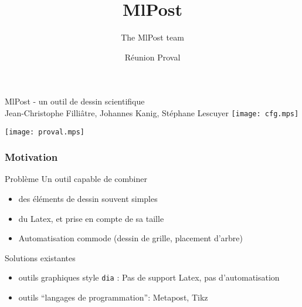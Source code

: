\documentclass[nodefaultblocks]{beamer}
\title{MlPost}
\author{The MlPost team}
\institute{Proval}
\date{Réunion Proval}
\begin{document}
\begin{frame}
  
  \begin{center}
    {\huge{MlPost - un outil de dessin scientifique}}\\[2em]
    {\large \alert{Jean-Christophe Filli\^atre, Johannes Kanig, St\'ephane Lescuyer}}
    \medskip
    \hfill\texttt{[image: cfg.mps]}
  \end{center}
  \hfill\texttt{[image: proval.mps]}
\end{frame}

\begin{frame}\frametitle{Motivation}

  \begin{block}{Problème}
    Un outil capable de combiner
    \begin{itemize}
      \item des éléments de dessin souvent simples
      \item du Latex, et prise en compte de sa taille
      \item Automatisation commode (dessin de grille, placement d'arbre)
    \end{itemize}
  \end{block}

  \begin{block}{Solutions existantes}
    \begin{itemize}
      \item outils graphiques style {\tt dia} : Pas de support Latex, pas
        d'automatisation
      \item outils ``langages de programmation'': Metapost, Tikz
    \end{itemize}
  \end{block}
  
\end{frame}
\end{document}
